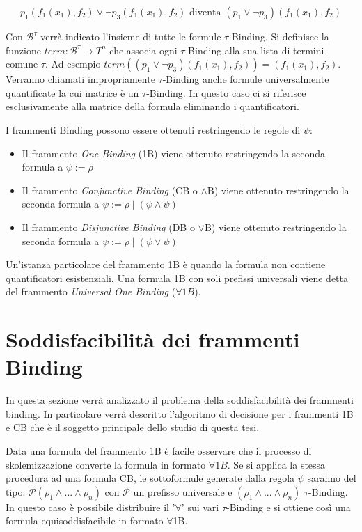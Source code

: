 \documentclass[./main.tex]{subfiles}
\begin{document}
$$p_1(f_1(x_1), f_2) \lor \lnot p_3(f_1(x_1), f_2) \text{ diventa } (p_1 \lor \lnot p_3)(f_1(x_1), f_2)$$

Con $\mathcal{B}^\tau$ verrà indicato l'insieme di tutte le formule $\tau$-Binding.
Si definisce la funzione $term: \mathcal{B}^\tau \rightarrow T^n$ 
che associa ogni $\tau$-Binding alla sua lista di termini comune $\tau$.
Ad esempio $term((p_1 \lor \lnot p_3)(f_1(x_1), f_2)) = (f_1(x_1), f_2)$.
Verranno chiamati impropriamente $\tau$-Binding anche formule universalmente quantificate la cui matrice è un $\tau$-Binding.
In questo caso ci si riferisce esclusivamente alla matrice della formula eliminando i quantificatori.


I frammenti Binding possono essere ottenuti restringendo le regole di $\psi$:

\begin{itemize}
    \item Il frammento \textit{One Binding} (1B) viene ottenuto restringendo la seconda formula 
    a $\psi := \rho$
    \item Il frammento \textit{Conjunctive Binding} (CB o $\land$B) viene ottenuto restringendo la seconda formula 
a $\psi := \rho \mid (\psi \land \psi)$
    \item Il frammento \textit{Disjunctive Binding} (DB o $\lor$B) viene ottenuto restringendo la seconda formula 
    a $\psi := \rho \mid (\psi \lor \psi)$
\end{itemize}

Un'istanza particolare del frammento 1B è quando la formula non contiene quantificatori esistenziali.
Una formula 1B con soli prefissi universali viene detta del frammento \textit{Universal One Binding} ($\forall 1B$).



\section{Soddisfacibilità dei frammenti Binding}
In questa sezione verrà analizzato il problema della soddisfacibilità dei frammenti binding.
In particolare verrà descritto l'algoritmo di decisione per i frammenti 1B e CB che è il soggetto principale dello studio di questa tesi.

Data una formula del frammento 1B è facile osservare che il processo di skolemizzazione
converte la formula in formato $\forall 1B$. 
Se si applica la stessa procedura ad una formula CB, le sottoformule generate dalla regola $\psi$ saranno del tipo:
$\mathcal{P} (\rho_1 \land ... \land \rho_n)$ con $\mathcal{P}$ un prefisso universale e $(\rho_1 \land ... \land \rho_n)$
$\tau$-Binding. In questo caso è possibile distribuire il '$\forall$' sui vari $\tau$-Binding e si ottiene così una formula 
equisoddisfacibile in formato $\forall$1B.
\end{document}
